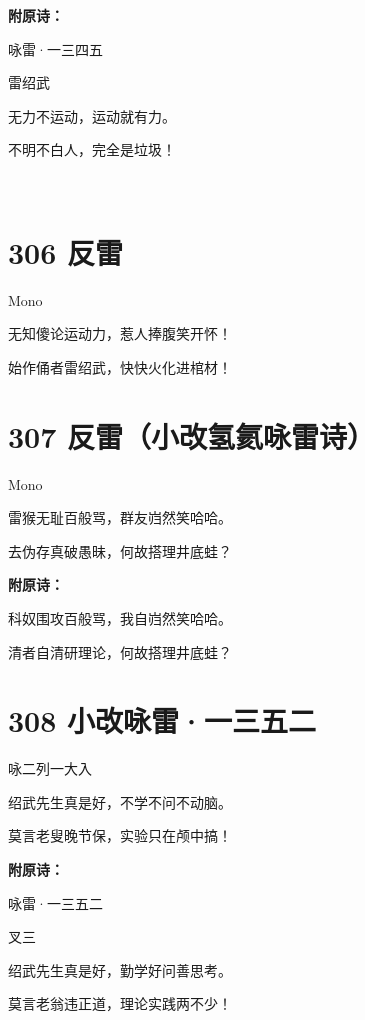 \documentclass[UTF8,12pt,oneside]{ctexbook}
\def\pau#1{\begin{center} {#1} \end{center}} %
\def\poem#1#2{\section{#1}\pau{#2}} %
\begin{document}
        \noindent \textbf{附原诗：}
        \begin{center}
        \heiti \Large 咏雷·一三四五
        \end{center}
        \begin{center}
            雷绍武
        \end{center}

        \begin{center}
            无力不运动，运动就有力。

            不明不白人，完全是垃圾！

            ~\\

        \end{center}

        \poem{306 反雷}{Mono}
        \begin{center}
            无知傻论运动力，惹人捧腹笑开怀！

            始作俑者雷绍武，快快火化进棺材！
        \end{center}

        \newpage

        \poem{307 反雷（小改氢氦咏雷诗）}{Mono}
        \begin{center}
            雷猴无耻百般骂，群友岿然笑哈哈。

            去伪存真破愚昧，何故搭理井底蛙？
        \end{center}

        \noindent \textbf{附原诗：}
        \begin{center}
            科奴围攻百般骂，我自岿然笑哈哈。

            清者自清研理论，何故搭理井底蛙？
        \end{center}

        \poem{308 小改咏雷·一三五二}{咏二列一大入}
        \begin{center}
            绍武先生真是好，不学不问不动脑。

            莫言老叟晚节保，实验只在颅中搞！
        \end{center}

        \noindent \textbf{附原诗：}
        \begin{center}
        \heiti \Large 咏雷·一三五二
        \end{center}
        \begin{center}
            叉三
        \end{center}

        \begin{center}
            绍武先生真是好，勤学好问善思考。

            莫言老翁违正道，理论实践两不少！
        \end{center}
\end{document}
